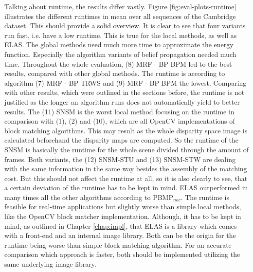 Talking about runtime, the results differ vastly.
Figure \ref{fig:eval-plots-runtime} illustrates the different runtimes in mean over all sequences of the Cambridge dataset.
This should provide a solid overview.
It is clear to see that four variants run fast, i.e. have a low runtime.
This is true for the local methods, as well as ELAS.
The global methods need much more time to approximate the energy function.
\newline\newline\noindent Especially the algorithm variants of belief propagation needed much time.
Throughout the whole evaluation, (8) MRF - BP BPM led to the best results, compared with other global methods.
The runtime is according to algorithm (7) MRF - BP TRWS and (9) MRF - BP BPM the lowest.
Comparing with other results, which were outlined in the sections before, the runtime is not justified as the longer an algorithm runs does not automatically yield to better results.
\newline\newline\noindent The (11) SNSM is the worst local method focusing on the runtime in comparison with (1), (2) and (10), which are all OpenCV implementations of block matching algorithms.
This may result as the whole disparity space image is calculated beforehand the disparity maps are computed.
So the runtime of the SNSM is basically the runtime for the whole scene divided through the amount of frames.
Both variants, the (12) SNSM-STU and (13) SNSM-STW are dealing with the same information in the same way besides the assembly of the matching cost.
But this should not affect the runtime at all, so it is also clearly to see, that a certain deviation of the runtime has to be kept in mind.
\newline\newline\noindent ELAS outperformed in many times all the other algorithms according to PBMP$_{noc}$.
The runtime is feasible for real-time applications but slightly worse than simple local methods, like the OpenCV block matcher implementation.
Although, it has to be kept in mind, as outlined in Chapter \ref{chap:impl}, that ELAS is a library which comes with a front-end and an internal image library.
Both can be the origin for the runtime being worse than simple block-matching algorithm.
For an accurate comparison which approach is faster, both should be implemented utilizing the same underlying image library.

